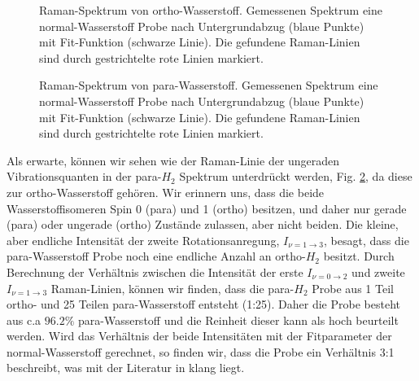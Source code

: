 \documentclass[11 pt]{article}
\begin{document}
\begin{figure}[htbp]
	\centering
   \caption{\small Raman-Spektrum von ortho-Wasserstoff. Gemessenen Spektrum eine normal-Wasserstoff Probe nach Untergrundabzug (blaue Punkte) mit Fit-Funktion (schwarze Linie). Die gefundene Raman-Linien sind durch gestrichtelte rote Linien markiert.}
   \label{fig:normal_H2}
\end{figure}

\begin{figure}[htbp]
	\centering
   \caption{\small Raman-Spektrum von para-Wasserstoff. Gemessenen Spektrum eine normal-Wasserstoff Probe nach Untergrundabzug (blaue Punkte) mit Fit-Funktion (schwarze Linie). Die gefundene Raman-Linien sind durch gestrichtelte rote Linien markiert.}
   \label{fig:para_H2}
\end{figure}

Als erwarte, können wir sehen wie der Raman-Linie der ungeraden Vibrationsquanten in der para-$H_2$ Spektrum unterdrückt werden, Fig. \ref{fig:para_H2}, da diese zur ortho-Wasserstoff gehören. Wir erinnern uns, dass die beide Wasserstoffisomeren Spin 0 (para) und 1 (ortho) besitzen, und daher nur gerade (para) oder ungerade  (ortho) Zustände zulassen, aber nicht beiden. Die kleine, aber endliche Intensität der zweite Rotationsanregung, $I_{\nu  = 1 \to 3}$, besagt, dass die para-Wasserstoff Probe noch eine endliche Anzahl an ortho-$H_2$ besitzt. Durch Berechnung der Verhältnis zwischen die Intensität der erste $I_{\nu  = 0 \to 2}$ und zweite $I_{\nu  = 1 \to 3}$ Raman-Linien, können wir finden, dass  die para-$H_2$ Probe aus 1 Teil ortho- und 25 Teilen para-Wasserstoff entsteht (1:25). Daher die Probe besteht aus c.a $96.2\%$ para-Wasserstoff und die Reinheit dieser kann als hoch beurteilt werden. Wird das Verhältnis der beide Intensitäten mit der Fitparameter der normal-Wasserstoff gerechnet, so finden wir, dass die Probe ein Verhältnis 3:1 beschreibt, was mit der Literatur in klang liegt.  
\end{document}
